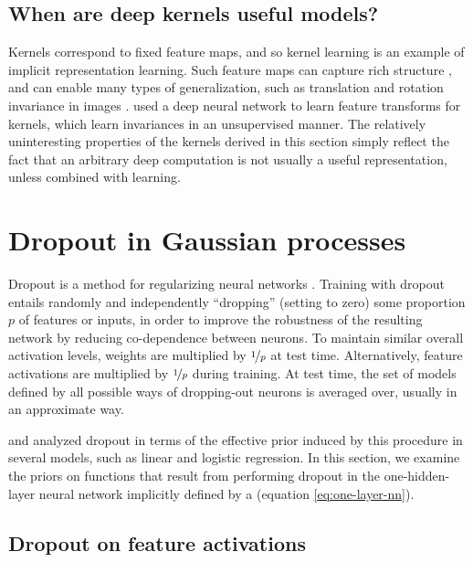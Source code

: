 \documentclass[twoside]{article}
\makeatletter
\newlength{\nonHumbleHeight}
\def\@humbleformat#1{{\settoheight{\nonHumbleHeight}{#1}\resizebox{!}{0.94\nonHumbleHeight}{#1}}}%
\newcommand\humble[1]{{\@humbleformat{#1}}}%
\newcommand{\gp}{{\humble{GP}}}
\newcommand{\sectiondist}{}
\makeatother
\begin{document}
\subsection{When are deep kernels useful models?}
\sectiondist
Kernels correspond to fixed feature maps, and so kernel learning is an example of implicit representation learning. %
Such feature maps can capture rich structure \citep{DuvLloGroetal13}, and can enable many types of generalization, such as translation and rotation invariance in images \citep{kondor2008group}.
\cite{SalHin08} used a deep neural network to learn feature transforms for kernels, which learn invariances in an unsupervised manner.
The relatively uninteresting properties of the kernels derived in this section simply reflect the fact that an arbitrary deep computation is not usually a useful representation, unless combined with learning.



\section{Dropout in Gaussian processes}
\sectiondist


Dropout is a method for regularizing neural networks \citep{hinton2012improving, srivastava2013improving}.
Training with dropout entails randomly and independently ``dropping'' (setting to zero) some proportion $p$ of features or inputs, in order to improve the robustness of the resulting network by reducing co-dependence between neurons.
To maintain similar overall activation levels, weights are multiplied by $\nicefrac{1}{p}$ at test time. Alternatively, feature activations are multiplied by $\nicefrac{1}{p}$ during training.
At test time, the set of models defined by all possible ways of dropping-out neurons is averaged over, usually in an approximate way.

\citet{baldi2013understanding} and \citet{wang2013fast} analyzed dropout in terms of the effective prior induced by this procedure in several models, such as linear and logistic regression.
In this section, we examine the priors on functions that result from performing dropout in the one-hidden-layer neural network implicitly defined by a \gp{} (equation \eqref{eq:one-layer-nn}).


\subsection{Dropout on feature activations}
\end{document}
